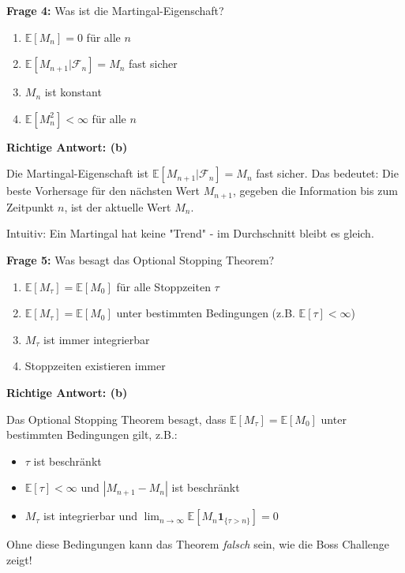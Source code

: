 \begin{multiplechoice}
\textbf{Frage 4:} Was ist die Martingal-Eigenschaft?\\

\begin{enumerate}[label=(\alph*)]
    \item $\mathbb{E}[M_n] = 0$ für alle $n$
    \item $\mathbb{E}[M_{n+1} | \mathcal{F}_n] = M_n$ fast sicher
    \item $M_n$ ist konstant
    \item $\mathbb{E}[M_n^2] < \infty$ für alle $n$
\end{enumerate}

\begin{solution}
\textbf{Richtige Antwort: (b)}

Die Martingal-Eigenschaft ist $\mathbb{E}[M_{n+1} | \mathcal{F}_n] = M_n$ fast sicher. Das bedeutet: Die beste Vorhersage für den nächsten Wert $M_{n+1}$, gegeben die Information bis zum Zeitpunkt $n$, ist der aktuelle Wert $M_n$.

Intuitiv: Ein Martingal hat keine "Trend" - im Durchschnitt bleibt es gleich.
\end{solution}
\end{multiplechoice}

\begin{multiplechoice}
\textbf{Frage 5:} Was besagt das Optional Stopping Theorem?

\begin{enumerate}[label=(\alph*)]
    \item $\mathbb{E}[M_\tau] = \mathbb{E}[M_0]$ für alle Stoppzeiten $\tau$
    \item $\mathbb{E}[M_\tau] = \mathbb{E}[M_0]$ unter bestimmten Bedingungen (z.B. $\mathbb{E}[\tau] < \infty$)
    \item $M_\tau$ ist immer integrierbar
    \item Stoppzeiten existieren immer
\end{enumerate}

\begin{solution}
\textbf{Richtige Antwort: (b)}

Das Optional Stopping Theorem besagt, dass $\mathbb{E}[M_\tau] = \mathbb{E}[M_0]$ unter bestimmten Bedingungen gilt, z.B.:
\begin{itemize}
    \item $\tau$ ist beschränkt
    \item $\mathbb{E}[\tau] < \infty$ und $|M_{n+1} - M_n|$ ist beschränkt
    \item $M_\tau$ ist integrierbar und $\lim_{n \to \infty} \mathbb{E}[M_n \mathbf{1}_{\{\tau > n\}}] = 0$
\end{itemize}

Ohne diese Bedingungen kann das Theorem \textit{falsch} sein, wie die Boss Challenge zeigt!
\end{solution}
\end{multiplechoice}

